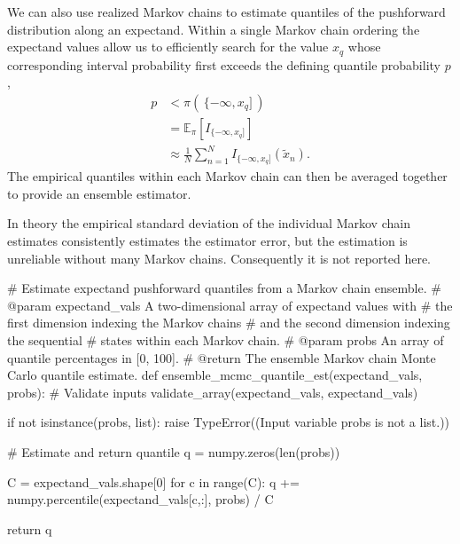 \documentclass[
  letterpaper,
  DIV=11,
  numbers=noendperiod]{scrartcl}
\newenvironment{Shaded}{\begin{snugshade}}{\end{snugshade}}
\newcommand{\BuiltInTok}[1]{\textcolor[rgb]{0.00,0.23,0.31}{#1}}
\newcommand{\CommentTok}[1]{\textcolor[rgb]{0.37,0.37,0.37}{#1}}
\newcommand{\ControlFlowTok}[1]{\textcolor[rgb]{0.00,0.23,0.31}{#1}}
\newcommand{\DecValTok}[1]{\textcolor[rgb]{0.68,0.00,0.00}{#1}}
\newcommand{\KeywordTok}[1]{\textcolor[rgb]{0.00,0.23,0.31}{#1}}
\newcommand{\NormalTok}[1]{\textcolor[rgb]{0.00,0.23,0.31}{#1}}
\newcommand{\OperatorTok}[1]{\textcolor[rgb]{0.37,0.37,0.37}{#1}}
\newcommand{\PreprocessorTok}[1]{\textcolor[rgb]{0.68,0.00,0.00}{#1}}
\newcommand{\StringTok}[1]{\textcolor[rgb]{0.13,0.47,0.30}{#1}}
\begin{document}
We can also use realized Markov chains to estimate quantiles of the
pushforward distribution along an expectand. Within a single Markov
chain ordering the expectand values allow us to efficiently search for
the value \(x_{q}\) whose corresponding interval probability first
exceeds the defining quantile probability \(p\), \begin{align*}
p
&<
\pi( \, \{ -\infty, x_{q} ] \, )
\\
&=
\mathbb{E}_{\pi} \left[ I_{ \{ -\infty, x_{q} ] } \right]
\\
&\approx
\frac{1}{N} \sum_{n = 1}^{N} I_{ \{ -\infty,  x_{q} ] }( \tilde{x}_{n}).
\end{align*} The empirical quantiles within each Markov chain can then
be averaged together to provide an ensemble estimator.

In theory the empirical standard deviation of the individual Markov
chain estimates consistently estimates the estimator error, but the
estimation is unreliable without many Markov chains. Consequently it is
not reported here.

\begin{Shaded}
\begin{Highlighting}[]
\CommentTok{\# Estimate expectand pushforward quantiles from a Markov chain ensemble.}
\CommentTok{\# @param expectand\_vals A two{-}dimensional array of expectand values with}
\CommentTok{\#                       the first dimension indexing the Markov chains}
\CommentTok{\#                       and the second dimension indexing the sequential}
\CommentTok{\#                       states within each Markov chain.}
\CommentTok{\# @param probs An array of quantile percentages in [0, 100].}
\CommentTok{\# @return The ensemble Markov chain Monte Carlo quantile estimate.}
\KeywordTok{def}\NormalTok{ ensemble\_mcmc\_quantile\_est(expectand\_vals, probs):}
  \CommentTok{\# Validate inputs}
\NormalTok{  validate\_array(expectand\_vals, }\StringTok{\textquotesingle{}expectand\_vals\textquotesingle{}}\NormalTok{)}

  \ControlFlowTok{if} \KeywordTok{not} \BuiltInTok{isinstance}\NormalTok{(probs, }\BuiltInTok{list}\NormalTok{):}
    \ControlFlowTok{raise} \PreprocessorTok{TypeError}\NormalTok{((}\StringTok{\textquotesingle{}Input variable \textasciigrave{}probs\textasciigrave{} is not a list.\textquotesingle{}}\NormalTok{))}

  \CommentTok{\# Estimate and return quantile}
\NormalTok{  q }\OperatorTok{=}\NormalTok{ numpy.zeros(}\BuiltInTok{len}\NormalTok{(probs))}

\NormalTok{  C }\OperatorTok{=}\NormalTok{ expectand\_vals.shape[}\DecValTok{0}\NormalTok{]}
  \ControlFlowTok{for}\NormalTok{ c }\KeywordTok{in} \BuiltInTok{range}\NormalTok{(C):}
\NormalTok{    q }\OperatorTok{+=}\NormalTok{ numpy.percentile(expectand\_vals[c,:], probs) }\OperatorTok{/}\NormalTok{ C}

  \ControlFlowTok{return}\NormalTok{ q}
\end{Highlighting}
\end{Shaded}
\end{document}
